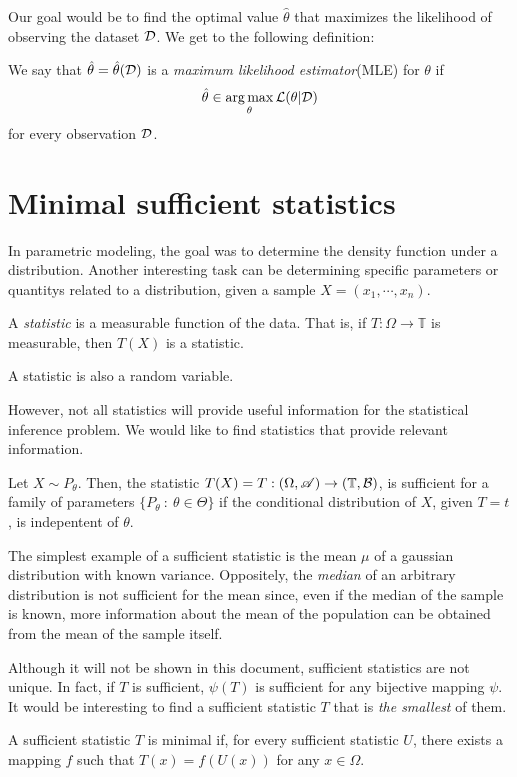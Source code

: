 Our goal would be to find the optimal value $\hat{\theta}$ that maximizes the likelihood of observing the dataset $\mathcal{D}$. We get to the following definition:

\begin{ndef}
    We say that $\hat{\theta} = \hat\theta (\mathcal{D})$ is a \emph{maximum likelihood estimator}(MLE) for $\theta$ if  
    $$
    \hat\theta \in \operatorname*{arg\,max}_{\theta} \mathcal L(\theta | \mathcal{D})
    $$
    for every observation $\mathcal{D}$. 
\end{ndef}

\section{Minimal sufficient statistics}

In parametric modeling, the goal was to determine the density function under a distribution. Another interesting task can be determining specific parameters or quantitys related to a distribution, given a sample $X = (x_1,\cdots,x_n)$.

\begin{ndef}
    A \emph{statistic} is a measurable function of the data. That is, if $T : \Omega \to \mathbb T$ is measurable, then $T(X)$ is a statistic.
\end{ndef}
\begin{remark}
    A statistic is also a random variable.
\end{remark}

However, not all statistics will provide useful information for the statistical inference problem. We would like to find statistics that provide relevant information.

\begin{ndef}
    Let $X \sim P_\theta$. Then, the statistic $T(X) = T : (\Omega, \mathscr{A}) \to (\mathbb T, \mathcal B)$, is sufficient for a family of parameters $\{P_\theta \ : \ \theta \in \Theta \}$ if the conditional distribution of $X$, given $T = t$, is indepentent of $\theta$.\\
\end{ndef}

\begin{nexample}
The simplest example of a sufficient statistic is the mean $\mu$ of a gaussian distribution with known variance. Oppositely, the \emph{median} of an arbitrary distribution
is not sufficient for the mean since, even if the median of the sample is known, more information about the mean of the population can be obtained from the mean of the sample itself.
\end{nexample}

Although it will not be shown in this document, sufficient statistics are not unique. In fact, if $T$ is sufficient, $\psi(T)$ is sufficient for any bijective mapping $\psi$. It would be interesting to find a sufficient statistic $T$ that is \emph{the smallest} of them.

\begin{ndef}
    A sufficient statistic $T$ is minimal if, for every sufficient statistic $U$, there exists a mapping $f$ such that $T(x) = f(U(x))$ for any $x \in \Omega$.
\end{ndef}